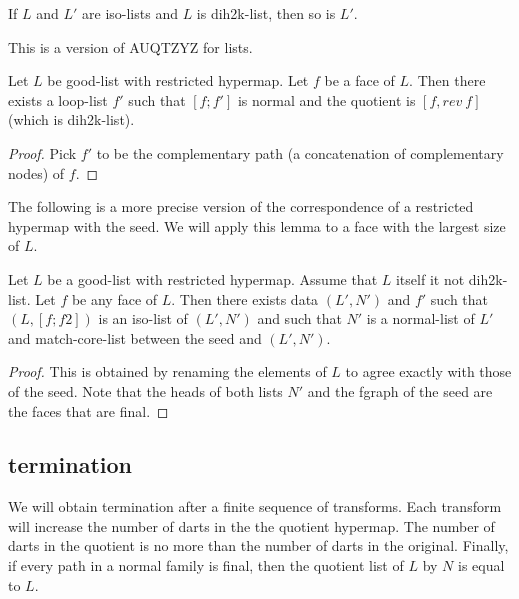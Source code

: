 \begin{lemma} If $L$ and $L'$ are iso-lists and $L$ is dih2k-list, then so is $L'$.
\end{lemma}

This is a version of AUQTZYZ for lists.

\begin{lemma}  Let $L$ be good-list with restricted hypermap.
Let $f$ be a face of $L$.  Then there exists a loop-list $f'$ such that $[f;f']$ is normal and the quotient
is $[f,rev~f]$ (which is dih2k-list).
\end{lemma}

\begin{proof} Pick $f'$ to be the complementary path (a concatenation of complementary nodes) of $f$.
\end{proof}

The following is a more precise version of the correspondence of a restricted hypermap with
the seed.  We will apply this lemma to a face with the largest size of $L$.

\begin{lemma}  Let $L$ be a good-list with restricted hypermap.  Assume
that $L$ itself it not dih2k-list.  Let $f$ be any face of $L$.  Then there exists data $(L',N')$ and $f'$
such that $(L,[f;f2])$ is an iso-list of $(L',N')$ and such that $N'$ is a normal-list of $L'$ and
match-core-list between the seed and $(L',N')$.
\end{lemma}

\begin{proof} This is obtained by renaming the elements of $L$ to agree exactly with those of the seed.
Note that the heads of both lists $N'$ and the fgraph of the seed are the faces that are final.
\end{proof}





\subsection{termination}

We will obtain termination after a finite sequence of transforms.  Each transform
will increase the number of darts in the the quotient hypermap.  The number of
darts in the quotient is no more than the number of darts in the original.  Finally,
if every path in a normal family is final, then the quotient list of $L$ by $N$ is equal to $L$.

